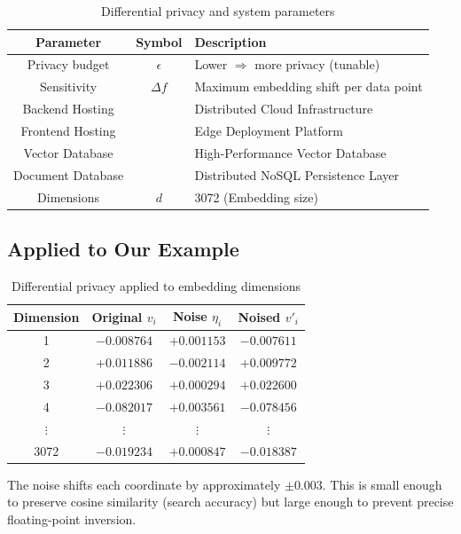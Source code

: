 \begin{table}[H]
\centering
\caption{Differential privacy and system parameters}
\label{tab:dp_params}
\begin{tabular}{ccl}
\toprule
\textbf{Parameter} & \textbf{Symbol} & \textbf{Description} \\
\midrule
Privacy budget & $\epsilon$ & Lower $\Rightarrow$ more privacy (tunable) \\
Sensitivity & $\Delta f$ & Maximum embedding shift per data point \\
Backend Hosting & & Distributed Cloud Infrastructure \\
Frontend Hosting & & Edge Deployment Platform \\
Vector Database & & High-Performance Vector Database \\
Document Database & & Distributed NoSQL Persistence Layer \\
Dimensions & $d$ & 3072 (Embedding size) \\
\bottomrule
\end{tabular}
\end{table}

\subsection{Applied to Our Example}

\begin{table}[H]
\centering
\caption{Differential privacy applied to embedding dimensions}
\label{tab:dp_example}
\begin{tabular}{cccc}
\toprule
\textbf{Dimension} & \textbf{Original $v_i$} & \textbf{Noise $\eta_i$} & \textbf{Noised $v'_i$} \\
\midrule
1 & $-0.008764$ & $+0.001153$ & $-0.007611$ \\
2 & $+0.011886$ & $-0.002114$ & $+0.009772$ \\
3 & $+0.022306$ & $+0.000294$ & $+0.022600$ \\
4 & $-0.082017$ & $+0.003561$ & $-0.078456$ \\
$\vdots$ & $\vdots$ & $\vdots$ & $\vdots$ \\
3072 & $-0.019234$ & $+0.000847$ & $-0.018387$ \\
\bottomrule
\end{tabular}
\end{table}

The noise shifts each coordinate by approximately $\pm 0.003$. This is small enough to preserve cosine similarity (search accuracy) but large enough to prevent precise floating-point inversion.

